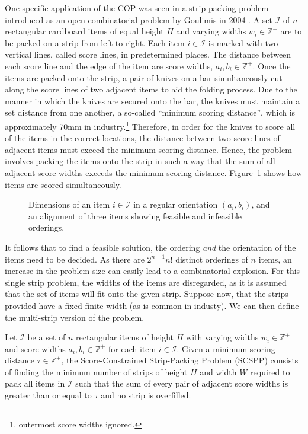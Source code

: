 \documentclass{elsarticle}
\begin{document}
One specific application of the COP was seen in a strip-packing problem introduced as an open-combinatorial problem by Goulimis in 2004 \cite{goulimis2004}. A set $\mathcal{I}$ of $n$ rectangular cardboard items of equal height $H$ and varying widths $w_i \in \mathbb{Z}^+$ are to be packed on a strip from left to right. Each item $i \in \mathcal{I}$ is marked with two vertical lines, called score lines, in predetermined places. The distance between each score line and the edge of the item are score widths, $a_i, b_i \in \mathbb{Z}^+$. Once the items are packed onto the strip, a pair of knives on a bar simultaneously cut along the score lines of two adjacent items to aid the folding process. Due to the manner in which the knives are secured onto the bar, the knives must maintain a set distance from one another, a so-called ``minimum scoring distance'', which is approximately 70mm in industry.\footnote{\alert{outermost score widths ignored.}} Therefore, in order for the knives to score all of the items in the correct locations, the distance between two score lines of adjacent items must exceed the minimum scoring distance. Hence, the problem involves packing the items onto the strip in such a way that the sum of all adjacent score widths exceeds the minimum scoring distance. Figure~\ref{fig:itemsknife} shows how items are scored simultaneously.

\begin{figure}[H]	
	\centering
	
	\caption{Dimensions of an item $i \in \mathcal{I}$ in a regular orientation $(a_i, b_i)$, and an alignment of three items showing feasible and infeasible orderings.}	
	\label{fig:itemsknife}
\end{figure}


It follows that to find a feasible solution, the ordering \emph{and} the orientation of the items need to be decided. As there are $2^{n-1} n!$ distinct orderings of $n$ items, an increase in the problem size can easily lead to a combinatorial explosion. For this single strip problem, the widths of the items are disregarded, as it is assumed that the set of items will fit onto the given strip. Suppose now, that the strips provided have a fixed finite width (as is common in industy). We can then define the multi-strip version of the problem.

\begin{definition}
	\label{defn:scspp}
	Let $\mathcal{I}$ be a set of $n$ rectangular items of height $H$ with varying widths $w_i \in \mathbb{Z}^+$ and score widths $a_i, b_i \in \mathbb{Z}^+$ for each item $i \in \mathcal{I}$. Given a minimum scoring distance $\tau \in \mathbb{Z}^+$, the Score-Constrained Strip-Packing Problem (SCSPP) consists of finding the minimum number of strips of height $H$ and width $W$ required to pack all items in $\mathcal{I}$ such that the sum of every pair of adjacent score widths is greater than or equal to $\tau$ and no strip is overfilled.
\end{definition}
\end{document}
